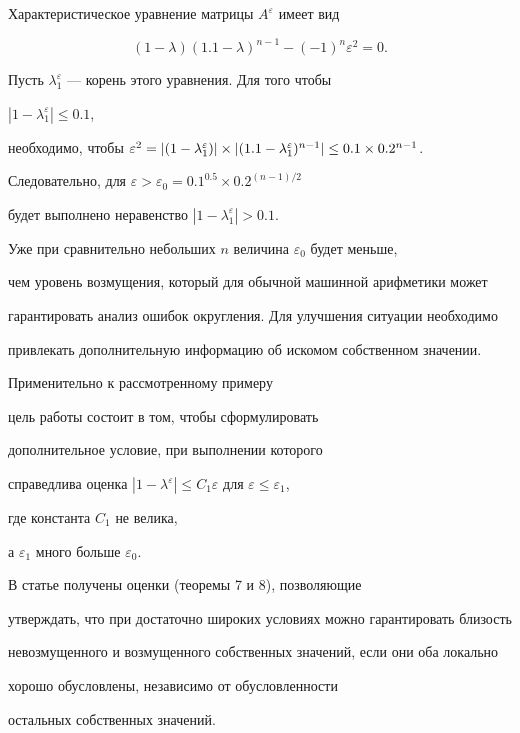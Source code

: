 Характеристическое уравнение матрицы $A^{\varepsilon}$ имеет вид


$$


(1-\lambda)(1.1-\lambda)^{n-1}-(-1)^n \varepsilon^2=0.


$$


Пусть $\lambda_1^\varepsilon$ --- корень этого уравнения. Для того чтобы


$|1-\lambda_1^{\varepsilon}|\le 0.1$,


необходимо, чтобы $\varepsilon^2=\linebreak |(1-\lambda_1^{\varepsilon}


)|\times|(1.1-\lambda_1^\varepsilon)^{n-1}|\le 0.1\times 0.2^{n-1}$.


Следовательно, для $\varepsilon> \varepsilon_0=0.1^{0.5}\times 0.2^{(n-1)/2}$


будет выполнено неравенство $|1-\lambda_1^{\varepsilon}|> 0.1$.


Уже при сравнительно небольших $n$ величина $\varepsilon_0$ будет меньше,


чем уровень возмущения, который для обычной машинной арифметики может


гарантировать анализ ошибок округления. Для улучшения ситуации необходимо


привлекать дополнительную информацию об искомом собственном значении.





Применительно к рассмотренному примеру


цель работы состоит в том, чтобы сформулировать


дополнительное условие, при выполнении которого


справедлива оценка $|1-\lambda^{\varepsilon}|


\le C_1 \varepsilon$ для $\varepsilon\le\varepsilon_1$,


где константа $C_1$ не велика,


а $\varepsilon_1$ много больше $\varepsilon_0$.


В статье получены оценки (теоремы 7 и 8), позволяющие


утверждать, что при достаточно широких условиях можно гарантировать близость


невозмущенного и возмущенного собственных значений, если они оба локально


хорошо обусловлены, независимо от обусловленности 


остальных собственных значений.


